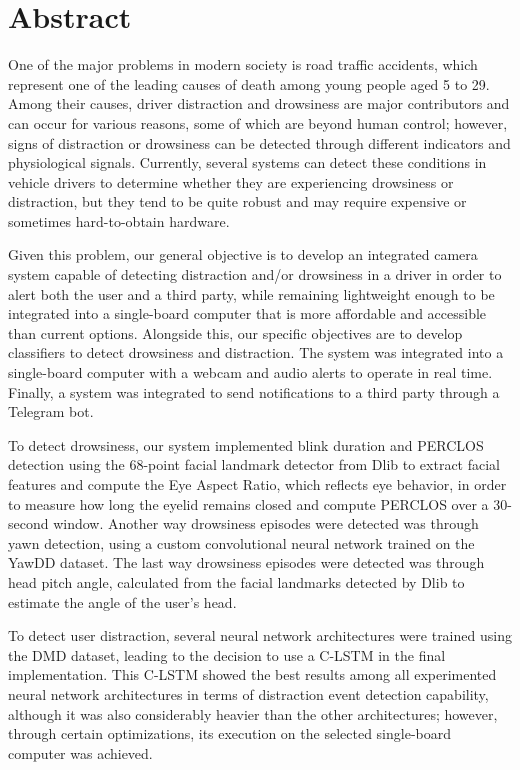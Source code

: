 %

\section*{Abstract}
\label{sec::abstract}

One of the major problems in modern society is road traffic accidents, which represent one of the leading causes of death among young people aged 5 to 29. Among their causes, driver distraction and drowsiness are major contributors and can occur for various reasons, some of which are beyond human control; however, signs of distraction or drowsiness can be detected through different indicators and physiological signals. Currently, several systems can detect these conditions in vehicle drivers to determine whether they are experiencing drowsiness or distraction, but they tend to be quite robust and may require expensive or sometimes hard-to-obtain hardware.

Given this problem, our general objective is to develop an integrated camera system capable of detecting distraction and/or drowsiness in a driver in order to alert both the user and a third party, while remaining lightweight enough to be integrated into a single-board computer that is more affordable and accessible than current options. Alongside this, our specific objectives are to develop classifiers to detect drowsiness and distraction. The system was integrated into a single-board computer with a webcam and audio alerts to operate in real time. Finally, a system was integrated to send notifications to a third party through a Telegram bot.

To detect drowsiness, our system implemented blink duration and PERCLOS detection using the 68-point facial landmark detector from Dlib to extract facial features and compute the Eye Aspect Ratio, which reflects eye behavior, in order to measure how long the eyelid remains closed and compute PERCLOS over a 30-second window. Another way drowsiness episodes were detected was through yawn detection, using a custom convolutional neural network trained on the YawDD dataset. The last way drowsiness episodes were detected was through head pitch angle, calculated from the facial landmarks detected by Dlib to estimate the angle of the user's head.

To detect user distraction, several neural network architectures were trained using the DMD dataset, leading to the decision to use a C-LSTM in the final implementation. This C-LSTM showed the best results among all experimented neural network architectures in terms of distraction event detection capability, although it was also considerably heavier than the other architectures; however, through certain optimizations, its execution on the selected single-board computer was achieved.

